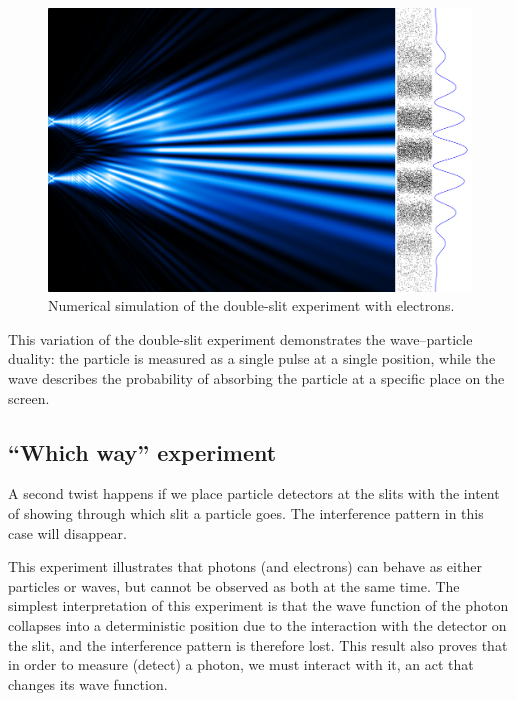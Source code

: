 \documentclass[
  9pt,
]{extbook}
\theoremstyle{definition}
\theoremstyle{definition}
\theoremstyle{definition}
\theoremstyle{remark}
\begin{document}
\begin{figure}

{\centering \includegraphics[width=0.7\linewidth]{./img/OEP_wiki4} 

}

\caption{Numerical simulation of the double-slit experiment with electrons.}\label{fig:Fig2c9}
\end{figure}

This variation of the double-slit experiment demonstrates the wave--particle duality: the particle is measured as a single pulse at a single position, while the wave describes the probability of absorbing the particle at a specific place on the screen.

\hypertarget{which-way-experiment}{%
\subsection{``Which way'' experiment}\label{which-way-experiment}}

A second twist happens if we place particle detectors at the slits with the intent of showing through which slit a particle goes. The interference pattern in this case will disappear.

This experiment illustrates that photons (and electrons) can behave as either particles or waves, but cannot be observed as both at the same time. The simplest interpretation of this experiment is that the wave function of the photon collapses into a deterministic position due to the interaction with the detector on the slit, and the interference pattern is therefore lost. This result also proves that in order to measure (detect) a photon, we must interact with it, an act that changes its wave function.
\end{document}
